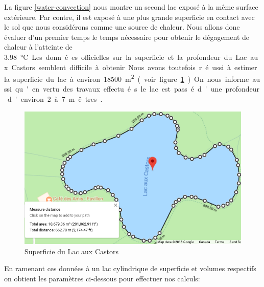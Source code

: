\documentclass[12pt]{article}
\newcommand\critical{\SI{3.98}\celsius}
\numberwithin{figure}{section}
\begin{document}
La figure \ref{water-convection} nous montre un second lac expos\'e \`a la m\^eme surface
ext\'erieure. Par contre, il est expos\'e \`a une plus grande superficie en contact avec le sol que
nous consid\'erons comme une source de chaleur. Nous allons donc \'evaluer d'un premier temps le
temps n\'ecessaire pour obtenir le d\'egagement de chaleur \`a l'atteinte de \critical.

Les donn\'ees officielles sur la superficie et la profondeur du Lac aux Castors semblent difficile
\`a obtenir. Nous avons toutefois r\'eussi \`a estimer la superficie du lac \`a environ
\SI{18500}{\square\meter} (voir figure \ref{google-castor}). On nous informe aussi qu'en vertu des travaux effectu\'es le lac est
pass\'e d'une profondeur d'environ 2 \`a 7 m\^etres~\cite{Lac-Castor}.

\begin{figure}\label{google-castor}
    \centering
    \includegraphics[scale=0.5]{Superficie.png}
    \caption{Superficie du Lac aux Castors}
\end{figure}

En ramenant ces donn\'ees \`a un lac cylindrique de superficie et volumes respectifs on obtient
les param\`etres ci-dessous pour effectuer nos calculs:
\end{document}
